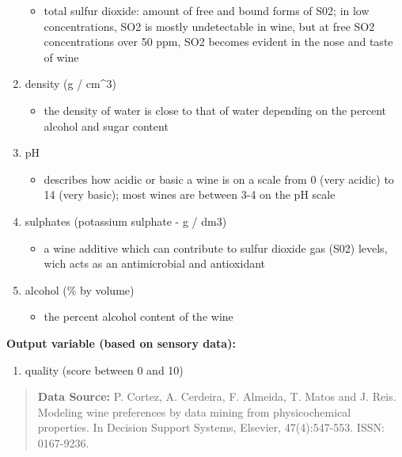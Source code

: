 \documentclass[]{article}
\providecommand{\tightlist}{%
  \setlength{\itemsep}{0pt}\setlength{\parskip}{0pt}}
\begin{document}
\begin{enumerate}
  \begin{itemize}
  \tightlist
  \item
    total sulfur dioxide: amount of free and bound forms of S02; in low
    concentrations, SO2 is mostly undetectable in wine, but at free SO2
    concentrations over 50 ppm, SO2 becomes evident in the nose and
    taste of wine
  \end{itemize}
\item
  density (g / cm\^{}3)

  \begin{itemize}
  \tightlist
  \item
    the density of water is close to that of water depending on the
    percent alcohol and sugar content
  \end{itemize}
\item
  pH

  \begin{itemize}
  \tightlist
  \item
    describes how acidic or basic a wine is on a scale from 0 (very
    acidic) to 14 (very basic); most wines are between 3-4 on the pH
    scale
  \end{itemize}
\item
  sulphates (potassium sulphate - g / dm3)

  \begin{itemize}
  \tightlist
  \item
    a wine additive which can contribute to sulfur dioxide gas (S02)
    levels, wich acts as an antimicrobial and antioxidant
  \end{itemize}
\item
  alcohol (\% by volume)

  \begin{itemize}
  \tightlist
  \item
    the percent alcohol content of the wine
  \end{itemize}
\end{enumerate}

\textbf{Output variable (based on sensory data):}

\begin{enumerate}
\def\labelenumi{\arabic{enumi}.}
\setcounter{enumi}{11}
\tightlist
\item
  quality (score between 0 and 10)
\end{enumerate}

\begin{quote}
\textbf{Data Source:} P. Cortez, A. Cerdeira, F. Almeida, T. Matos and
J. Reis. Modeling wine preferences by data mining from physicochemical
properties. In Decision Support Systems, Elsevier, 47(4):547-553. ISSN:
0167-9236.
\end{quote}
\end{document}
